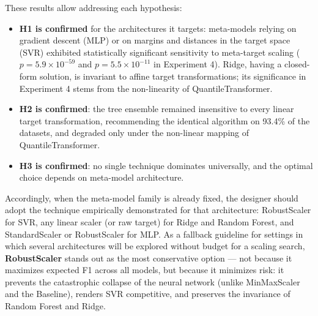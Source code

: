 \documentclass[12pt]{article}
\begin{document}
These results allow addressing each hypothesis:
\begin{itemize}
  \item \textbf{H1 is confirmed} for the architectures it targets: meta-models relying on gradient descent (MLP) or on margins and distances in the target space (SVR) exhibited statistically significant sensitivity to meta-target scaling ($p = 5.9 \times 10^{-59}$ and $p = 5.5 \times 10^{-11}$ in Experiment 4). Ridge, having a closed-form solution, is invariant to affine target transformations; its significance in Experiment 4 stems from the non-linearity of QuantileTransformer.
  \item \textbf{H2 is confirmed}: the tree ensemble remained insensitive to every linear target transformation, recommending the identical algorithm on 93.4\% of the datasets, and degraded only under the non-linear mapping of QuantileTransformer.
  \item \textbf{H3 is confirmed}: no single technique dominates universally, and the optimal choice depends on meta-model architecture.
\end{itemize}

Accordingly, when the meta-model family is already fixed, the designer should adopt the technique empirically demonstrated for that architecture: RobustScaler for SVR, any linear scaler (or raw target) for Ridge and Random Forest, and StandardScaler or RobustScaler for MLP. As a fallback guideline for settings in which several architectures will be explored without budget for a scaling search, \textbf{RobustScaler} stands out as the most conservative option --- not because it maximizes expected F1 across all models, but because it minimizes risk: it prevents the catastrophic collapse of the neural network (unlike MinMaxScaler and the Baseline), renders SVR competitive, and preserves the invariance of Random Forest and Ridge.



\end{document}
